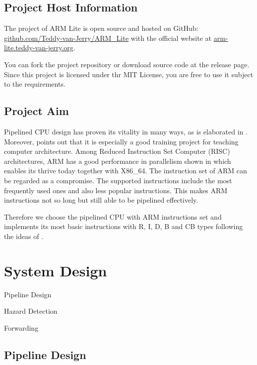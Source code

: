 \documentclass[11pt,fancy,bibstyle=ieee]{elegantbook}
\begin{document}
  \section{Project Host Information}

    The project of ARM Lite is open source and hosted on GitHub: \href{https://github.com/Teddy-van-Jerry/ARM_Lite}{github.com/Teddy-van-Jerry/ARM\_Lite} with the official website at \href{https://arm-lite.teddy-van-jerry.org}{arm-lite.teddy-van-jerry.org}.

    You can fork the project repository or download source code at the release page.
    Since this project is licensed under thr MIT License,
    you are free to use it subject to the requirements.

  \section{Project Aim}

    Pipelined CPU design has proven its vitality in many ways,
    as is elaborated in \cite{sohi1990instruction,qin2018design}.
    Moreover, \cite{lee2011pipelined} points out that it is especially a good training project for teaching computer architecture.
    Among Reduced Instruction Set Computer (RISC) architectures, ARM has a good performance in parallelism shown in \cite{goodacre2005parallelism} which enables its thrive today together with X86\_64.
    The instruction set of ARM can be regarded as a compromise.
    The supported instructions include the most frequently used ones and also less popular instructions.
    This makes ARM instructions not so long but still able to be pipelined effectively.

    Therefore we choose the pipelined CPU with ARM instructions set and implements its most basic instructions with R, I, D, B and CB types following the ideas of \cite{patterson2016computer}.

\chapter{System Design}

  \begin{introduction}
    \item Pipeline Design
    \item Hazard Detection
    \item Forwarding
  \end{introduction}

  \section{Pipeline Design}
\end{document}
